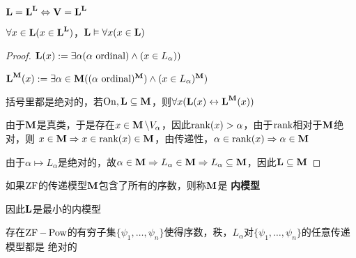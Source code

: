\documentclass[11pt]{article}
\begin{document}
\(\bL=\bL^{\bL}\Leftrightarrow\bV=\bL^{\bL}\)

\(\forall x\in\bL(x\in\bL^{\bL})\)，\(\bL\vDash\forall x(x\in\bL)\)

\begin{proof}
\(\bL(x):=\exists\alpha(\alpha\text{ ordinal})\wedge(x\in L_\alpha))\)

\(\bL^{\bM}(x):=\exists\alpha\in\bM((\alpha\text{ ordinal})^{\bM})\wedge(x\in L_\alpha)^{\bM})\)

括号里都是绝对的，若\(\On,\bL\subseteq\bM\)，则\(\forall x(\bL(x)\leftrightarrow\bL^{\bM}(x))\)

由于\(\bM\)是真类，于是存在\(x\in\bM\setminus V_\alpha\)，因此\(\rank(x)>\alpha\)，由于\(\rank\)相对于\(\bM\)绝对，则
\(x\in\bM\Rightarrow x\in\rank(x)\in\bM\)，由传递性，\(\alpha\in\rank(x)\Rightarrow\alpha\in\bM\)

由于\(\alpha\mapsto L_\alpha\)是绝对的，故\(\alpha\in\bM\Rightarrow L_\alpha\in\bM\Rightarrow L_\alpha\subseteq\bM\)，因此\(\bL\subseteq\bM\)
\end{proof}

\begin{definition}[]
如果\(\ZF\)的传递模型\(\bM\)包含了所有的序数，则称\(\bM\)是 \textbf{内模型}
\end{definition}

因此\(\bL\)是最小的内模型

\begin{lemma}[ZF]
存在\(\ZF-\Pow\)的有穷子集\(\{\psi_1,\dots,\psi_n\}\)使得序数，秩，\(L_\alpha\)对\(\{\psi_1,\dots,\psi_n\}\)的任意传递模型都是
绝对的
\end{lemma}
\end{document}
